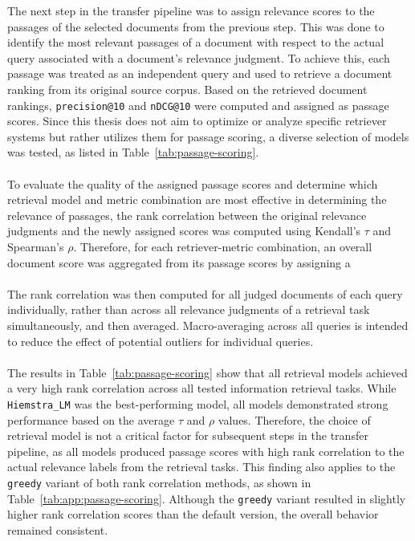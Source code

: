 The next step in the transfer pipeline was to assign relevance scores to the passages of the selected documents from the previous step. This was done to identify the most relevant passages of a document with respect to the actual query associated with a document's relevance judgment. To achieve this, each passage was treated as an independent query and used to retrieve a document ranking from its original source corpus. Based on the retrieved document rankings, \texttt{precision@10} and \texttt{nDCG@10} were computed and assigned as passage scores. Since this thesis does not aim to optimize or analyze specific retriever systems but rather utilizes them for passage scoring, a diverse selection of models was tested, as listed in Table~\ref{tab:passage-scoring}.
\\\\
To evaluate the quality of the assigned passage scores and determine which retrieval model and metric combination are most effective in determining the relevance of passages, the rank correlation between the original relevance judgments and the newly assigned scores was computed using Kendall's $\tau$ and Spearman's $\rho$. Therefore, for each retriever-metric combination, an overall document score was aggregated from its passage scores by assigning a 
\\\\
The rank correlation was then computed for all judged documents of each query individually, rather than across all relevance judgments of a retrieval task simultaneously, and then averaged. Macro-averaging across all queries is intended to reduce the effect of potential outliers for individual queries.
\\\\
The results in Table~\ref{tab:passage-scoring} show that all retrieval models achieved a very high rank correlation across all tested information retrieval tasks. While \texttt{Hiemstra\_LM} was the best-performing model, all models demonstrated strong performance based on the average $\tau$ and $\rho$ values. Therefore, the choice of retrieval model is not a critical factor for subsequent steps in the transfer pipeline, as all models produced passage scores with high rank correlation to the actual relevance labels from the retrieval tasks. This finding also applies to the \texttt{greedy} variant of both rank correlation methods, as shown in Table~\ref{tab:app:passage-scoring}. Although the \texttt{greedy} variant resulted in slightly higher rank correlation scores than the default version, the overall behavior remained consistent.
